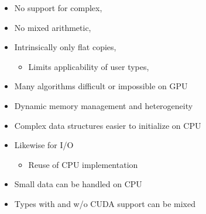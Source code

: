 
\addtocounter{framenumber}{1}




\begin{frame}
  \begin{itemize}
  \item No support for complex,
  \item No mixed arithmetic,
  \item Intrinsically only flat copies,
    \begin{itemize}
    \item Limits applicability of user types,
    \end{itemize}
  \item Many algorithms difficult or impossible on GPU
  \end{itemize}

\end{frame}

\begin{frame}
  \begin{itemize}
  \item Dynamic memory management and heterogeneity
  \item Complex data structures easier to initialize on CPU
  \item Likewise for I/O
    \begin{itemize}
    \item Reuse of CPU implementation
    \end{itemize}
  \item Small data can be handled on CPU
  \item Types with and w/o CUDA support can be mixed
  \end{itemize}
\end{frame}


